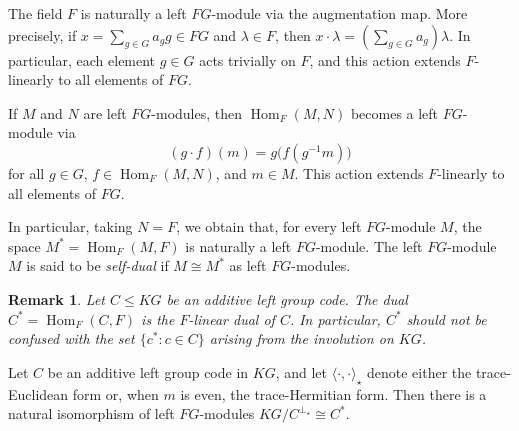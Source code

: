 \documentclass[11pt]{article}
\newtheorem{remark}[theorem]{Remark}
\begin{document}
The field $F$ is naturally a left $FG$-module via the augmentation map. More
precisely, if $x=\sum_{g\in G}a_g g\in FG$ and $\lambda\in F$, then
$x\cdot\lambda=\left(\sum_{g\in G}a_g\right)\lambda$. In particular, each
element $g\in G$ acts trivially on $F$, and this action extends $F$-linearly
to all elements of $FG$.

If $M$ and $N$ are left $FG$-modules, then
$\operatorname{Hom}_F(M,N)$ becomes a left $FG$-module via
$$(g\cdot f)(m)=g\bigl(f(g^{-1}m)\bigr)$$
for all $g\in G$, $f\in\operatorname{Hom}_F(M,N)$, and $m\in M$. This action
extends $F$-linearly to all elements of $FG$.

In particular, taking $N=F$, we obtain that, for every left $FG$-module $M$,
the space $M^*=\operatorname{Hom}_F(M,F)$ is naturally a left $FG$-module.
The left $FG$-module $M$ is said to be \emph{self-dual} if
$M\cong M^*$ as left $FG$-modules.

\begin{remark}
Let $C\leq KG$ be an additive left group code. The dual
$C^*=\operatorname{Hom}_F(C,F)$ is the $F$-linear dual of $C$. In particular,
$C^*$ should not be confused with the set $\{c^*:c\in C\}$ arising from the
involution on $KG$.
\end{remark}


\begin{proposition}
Let $C$ be an additive left group code in $KG$, and let $\langle\cdot,\cdot\rangle_\star$ denote either the trace-Euclidean form or, when $m$ is even, the trace-Hermitian form. Then there is a natural isomorphism of left $FG$-modules $KG/C^{\perp_\star}\cong C^*$.
\end{proposition}
\end{document}
